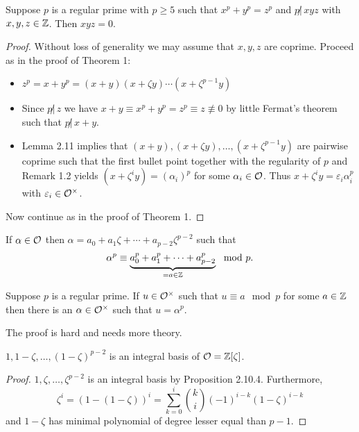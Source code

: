 
\begin{Prop}
	Suppose $p$ is a regular prime with $p \geq 5$ such that 
	$x^p +y^p = z^p$ and $p \not | \, xyz$ with $x,y,z \in \mathbb{Z}$.
	Then $xyz = 0$.
\end{Prop}

\begin{proof}
	Without loss of generality we may assume that $x,y,z$ are coprime. Proceed as in the proof of Theorem 1:
	\begin{itemize}
		\item $z^p = x + y^p = (x+y)(x+\zeta y) \cdots \left( x+ \zeta^{p-1}y \right)$
		\item Since $p\not | \, z$ we have 
				$x+y \equiv x^p + y^p = z^p \equiv z \not \equiv 0$
				by little Fermat's theorem such that $p \not | \, x+y$.
		\item Lemma 2.11 implies that $(x+y),(x+\zeta y), \dots, \left( x+ 
				\zeta^{p-1}y \right)$ are pairwise coprime such that the first bullet point together with the regularity of $p$ and Remark 1.2 yields
				$ \left( x+ \zeta^i y \right)= \left( \alpha_i \right)^p$ for some $\alpha_i \in \mathcal{O}$. Thus $x+ \zeta^i y = \varepsilon_i  \alpha_i^p$ with
				$\varepsilon_i \in \mathcal{O}^\times$.
	\end{itemize}
	Now continue as in the proof of Theorem 1.
\end{proof}

\begin{recall*}[Example 1.2.8]
	If $\alpha \in \mathcal{O}$ then $\alpha = a_0 + a_1 \zeta + \cdots + a_{p-2} \zeta^{p-2}$ such that
	\[ \alpha^p \equiv \underbrace{a_0^p + a_1^p + \cdots + a_{p-2} ^p}_{= a \in \mathbb{Z}} \mod p.
	\]
\end{recall*}

\begin{Lem}
	Suppose $p$ is a regular prime. If $u \in\mathcal{O}^\times$ such that $u\equiv a \mod p$ for some $a \in \mathbb{Z}$ then there is an $\alpha \in\mathcal{O}^\times$ such that $u = \alpha^p$.
\end{Lem}

The proof is hard and needs more theory.


\begin{Bem}
	$1, 1- \zeta, \dots, (1-\zeta)^{p-2}$ is an integral basis of $\mathcal{O}=\mathbb{Z}[\zeta]$.
\end{Bem}

\begin{proof}
	$1,  \zeta, \dots, \zeta^{p-2}$ is an integral basis by Proposition 2.10.4. Furthermore,
	\[ \zeta^i = \left(1-  (1-\zeta)\right)^i
	=\sum_{k=0}^{i} \binom{k}{i} (-1)^{i-k} (1-\zeta)^{i-k}
	\]
	and $1-\zeta$ has minimal polynomial of degree lesser equal than $p-1$.
\end{proof}

